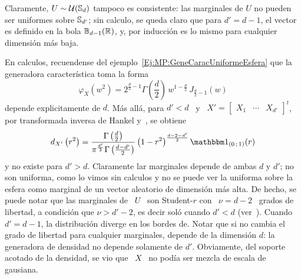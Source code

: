 \begin{ejemplo}\label{Ej:MP:UniformeCnt}
%
  Claramente, $U \sim  \mathcal{U}(\mathbb{S}_d)$ tampoco es consistente: las  marginales de $U$ no
  pueden ser uniformes sobre $\mathbb{S}_{d'}$;  sin calculo, se queda claro que para
  $d' =  d-1$, el  vector es  definido en la  bola $\mathbb{B}_{d-1}(\mathbb{R})$,  y, por
  inducci\'on es lo mismo para cualquier dimensi\'on m\'as baja.

  En  calculos, recuendense del  ejemplo~\ref{Ej:MP:GeneCaracUniformeEsfera} que
  la generadora caracter\'istica toma la forma
  \[
  \varphi_X\left(  w^2  \right)  =  2^{\frac{d}{2}-1}  \Gamma\left(  \frac{d}{2}
  \right) \, w^{1-\frac{d}{2}} \, J_{\frac{d}{2}-1}\left( w \right)
  \]
  depende  explicitamente  de $d$.  M\'as  all\'a,  para $d'  <  d$  \  y \  $X'
  =  \begin{bmatrix} X_1 &  \cdots &  X_{d'} \end{bmatrix}^t$,  por transformada
  inversa de Hankel y~\cite[Ec.~6.575-1]{GraRyz15}, se obtiene
  \[
  d_{X'}\left(     r^2      \right)     =     \frac{\Gamma\left(     \frac{d}{2}
    \right)}{\pi^{\frac{d'}{2}} \Gamma\left( \frac{d-d'}{2}  \right)} \left( 1 -
    r^2 \right)^{\frac{d-2-d'}{2}} \un_{(0 \; 1)}(r)
  \]
  y no existe para  $d' > d$.  Claramente lar marginales depende  de ambas $d$ y
  $d'$;  no son  uniforma, como  lo vimos  sin  calculos y  no se  puede ver  la
  uniforma sobre la  esfera como marginal de un  vector aleatorio de dimensi\'on
  m\'as  alta.  De  hecho, se  puede notar  que las  marginales de  \ $U$  \ son
  Student-$r$ con \ $\nu  = d-2$ \ grados de libertad, a  condici\'on que $\nu >
  d'-2$, es decir sol\'o cuando $d'  < d$ (ver~\cite{titi, toto, Zoz}). Cuando \
  $d' = d-1$, la distribuci\'on diverge en los bordes de. Notar que si no cambia
  el grado de libertad para cualquier marginales, depende de la dimensi\'on $d$:
  la  generadora de  densidad no  depende  solamente de  $d'$.  Obviamente,  del
  soporte acotado de  la densidad, se vio que  \ $X$ \ no pod\'ia  ser mezcla de
  escala de gausiana.
\end{ejemplo}

